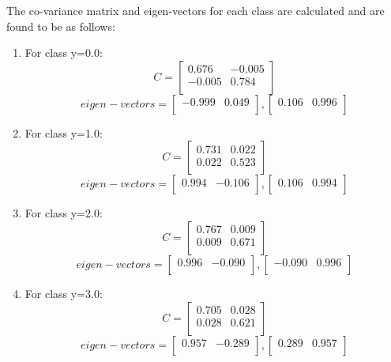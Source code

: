 \documentclass[11pt,a4paper]{article}
\newcommand{\noi}{\noindent}
\begin{document}
\noi
The co-variance matrix and eigen-vectors for each class are calculated and are found to be as follows:
\begin{enumerate}
    \item For class y=0.0: 
    $$
    C = 
    \begin{bmatrix}
    0.676 & -0.005 \\
    -0.005 & 0.784 \\
    \end{bmatrix}
    $$
    $$
    eigen-vectors = 
    \begin{bmatrix}
    -0.999 & 0.049 \\
    \end{bmatrix}
    ,
    \begin{bmatrix}
    0.106 & 0.996 \\
    \end{bmatrix}
    $$
    \item For class y=1.0:
    $$
    C = 
    \begin{bmatrix}
    0.731 & 0.022 \\
    0.022 & 0.523 \\
    \end{bmatrix}
    $$
    $$
    eigen-vectors = 
    \begin{bmatrix}
    0.994 & -0.106 \\
    \end{bmatrix}
    ,
    \begin{bmatrix}
    0.106 & 0.994 \\
    \end{bmatrix}
    $$
    \item For class y=2.0:
    $$
    C = 
    \begin{bmatrix}
    0.767 & 0.009 \\
    0.009 & 0.671 \\
    \end{bmatrix}
    $$
    $$
    eigen-vectors = 
    \begin{bmatrix}
    0.996 & -0.090 \\
    \end{bmatrix}
    ,
    \begin{bmatrix}
    -0.090 & 0.996 \\
    \end{bmatrix}
    $$
    \item For class y=3.0:
    $$
    C = 
    \begin{bmatrix}
    0.705 & 0.028 \\
    0.028 & 0.621 \\
    \end{bmatrix}
    $$
    $$
    eigen-vectors = 
    \begin{bmatrix}
    0.957 & -0.289 \\
    \end{bmatrix}
    ,
    \begin{bmatrix}
    0.289 & 0.957 \\
    \end{bmatrix}
    $$
    
    
    
\end{enumerate}
\end{document}
